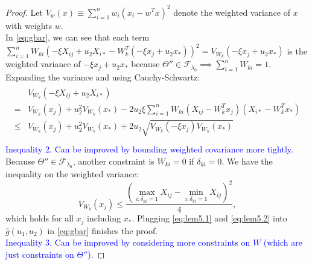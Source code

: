 \documentclass{article}
\providecommand{\comment}[1]{\textcolor{blue}{#1}}
\begin{document}
\begin{proof}
    Let $V_{w}(x)\equiv\sum_{i=1}^nw_{i}\left(x_i-w^Tx\right)^2$ denote the weighted variance of $x$ with weights $w$.\\
    In \eqref{eq:gbar}, we can see that each term $\sum_{i=1}^nW_{ki}\left(-\xi X_{ij}+u_2X_{i*}-W_k^T(-\xi x_j+u_2x_*)\right)^2=V_{W_k}(-\xi x_j+u_2x_*)$ is the weighted variance of $-\xi x_j+u_2x_*$ because $\Theta''\in\mathcal{F}_{\lambda_0}\implies\sum_{i=1}^nW_{ki}=1$. Expanding the variance and using Cauchy-Schwartz:
    \begin{gather}
    \label{eq:lem5.1}
    \begin{aligned}
        &V_{W_k}\left(-\xi X_{ij}+u_2X_{i*}\right)\\
        =&V_{W_k}(x_j)+u_2^2V_{W_k}(x_*)-2u_2\xi\sum_{i=1}^nW_{ki}\left(X_{ij}-W_k^Tx_j\right)\left(X_{i*}-W_k^Tx_*\right)\\
        \leq &V_{W_k}(x_j)+u_2^2V_{W_k}(x_*)+2u_2\sqrt{V_{W_k}(-\xi x_j)V_{W_k}(x_*)}\\
    \end{aligned}
    \end{gather}
    \comment{Inequality 2. Can be improved by bounding weighted covariance more tightly.}\\
    Because $\Theta''\in\mathcal{F}_{\lambda_0}$, another constraint is $W_{ki}=0$ if $\delta_{ki}=0$. We have the inequality on the weighted variance:
    \begin{equation}
        \label{eq:lem5.2}
        V_{W_k}(x_j)\leq \frac{\left(\max_{i:\delta_{ki}=1}X_{ij}-\min_{i:\delta_{ki}=1}X_{ij}\right)^2}{4},
    \end{equation}
    which holds for all $x_j$ including $x_*$. Plugging \eqref{eq:lem5.1} and \eqref{eq:lem5.2} into $\bar{g}(u_1,u_2)$ in \eqref{eq:gbar} finishes the proof.\\
    \comment{Inequality 3. Can be improved by considering more constraints on $W$ (which are just constraints on $\Theta''$).}
\end{proof}
\end{document}

